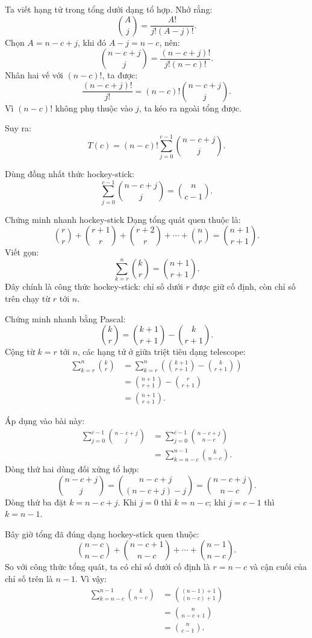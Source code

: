 \documentclass[12pt]{article}
\begin{document}
Ta viết hạng tử trong tổng dưới dạng tổ hợp. Nhớ rằng:
\[
\binom{A}{j}
=
\frac{A!}{j!(A-j)!}.
\]
Chọn \(A=n-c+j\), khi đó \(A-j=n-c\), nên:
\[
\binom{n-c+j}{j}
=
\frac{(n-c+j)!}{j!(n-c)!}.
\]
Nhân hai vế với \((n-c)!\), ta được:
\[
\frac{(n-c+j)!}{j!}
=
(n-c)!\binom{n-c+j}{j}.
\]
Vì \((n-c)!\) không phụ thuộc vào \(j\), ta kéo ra ngoài tổng được.

Suy ra:
\[
T(c)=
(n-c)!
\sum_{j=0}^{c-1}
\binom{n-c+j}{j}.
\]

Dùng đồng nhất thức hockey-stick:
\[
\sum_{j=0}^{c-1}
\binom{n-c+j}{j}
=
\binom{n}{c-1}.
\]

\begin{notebox}{Chứng minh nhanh hockey-stick}
Dạng tổng quát quen thuộc là:
\[
\binom{r}{r}
+
\binom{r+1}{r}
+
\binom{r+2}{r}
+
\cdots
+
\binom{n}{r}
=
\binom{n+1}{r+1}.
\]
Viết gọn:
\[
\sum_{k=r}^{n}\binom{k}{r}
=
\binom{n+1}{r+1}.
\]
Đây chính là công thức hockey-stick: chỉ số dưới \(r\) được giữ cố định,
còn chỉ số trên chạy từ \(r\) tới \(n\).

Chứng minh nhanh bằng Pascal:
\[
\binom{k}{r}
=
\binom{k+1}{r+1}-\binom{k}{r+1}.
\]
Cộng từ \(k=r\) tới \(n\), các hạng tử ở giữa triệt tiêu dạng telescope:
\[
\begin{aligned}
\sum_{k=r}^{n}\binom{k}{r}
&=
\sum_{k=r}^{n}
\left(
\binom{k+1}{r+1}-\binom{k}{r+1}
\right)\\
&=
\binom{n+1}{r+1}-\binom{r}{r+1}\\
&=
\binom{n+1}{r+1}.
\end{aligned}
\]

Áp dụng vào bài này:
\[
\begin{aligned}
\sum_{j=0}^{c-1}\binom{n-c+j}{j}
&=
\sum_{j=0}^{c-1}\binom{n-c+j}{n-c}\\
&=
\sum_{k=n-c}^{n-1}\binom{k}{n-c}.
\end{aligned}
\]
Dòng thứ hai dùng đối xứng tổ hợp:
\[
\binom{n-c+j}{j}
=
\binom{n-c+j}{(n-c+j)-j}
=
\binom{n-c+j}{n-c}.
\]
Dòng thứ ba đặt \(k=n-c+j\). Khi \(j=0\) thì \(k=n-c\);
khi \(j=c-1\) thì \(k=n-1\).

Bây giờ tổng đã đúng dạng hockey-stick quen thuộc:
\[
\binom{n-c}{n-c}
+
\binom{n-c+1}{n-c}
+
\cdots
+
\binom{n-1}{n-c}.
\]
So với công thức tổng quát, ta có chỉ số dưới cố định là \(r=n-c\)
và cận cuối của chỉ số trên là \(n-1\). Vì vậy:
\[
\begin{aligned}
\sum_{k=n-c}^{n-1}\binom{k}{n-c}
&=
\binom{(n-1)+1}{(n-c)+1}\\
&=
\binom{n}{n-c+1}\\
&=
\binom{n}{c-1}.
\end{aligned}
\]
\end{notebox}
\end{document}
